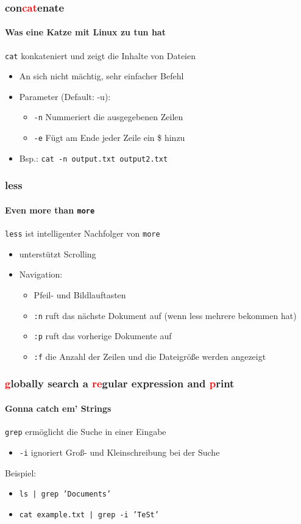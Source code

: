 \documentclass[12pt,utf8]{beamer}
\begin{document}
\begin{frame}
	\frametitle{con\textcolor{red}{cat}enate}
	\framesubtitle{\textcolor{ownDarkOr}{Was eine Katze mit Linux zu tun hat}}
	\texttt{cat} konkateniert und zeigt die Inhalte von Dateien
	\begin{itemize}
		\item An sich nicht mächtig, sehr einfacher Befehl
		\item Parameter (Default: -u):
		\begin{itemize}[<+->]
			\item \texttt{-n} Nummeriert die ausgegebenen Zeilen 
			\item \texttt{-e} Fügt am Ende jeder Zeile ein \$ hinzu
		\end{itemize}
		\item Bsp.: \texttt{cat -n output.txt output2.txt}
	\end{itemize}
\end{frame}

\begin{frame}
\frametitle{less}
\framesubtitle{\textcolor{ownDarkOr}{Even more than \texttt{more}}}
\texttt{less} ist intelligenter Nachfolger von \texttt{more}
\begin{itemize}
	\item unterstützt Scrolling
	\item Navigation:
	\begin{itemize}[<+->]
		\item Pfeil- und Bildlauftasten
		\item \texttt{:n} ruft das nächste Dokument auf (wenn less mehrere bekommen hat)
		\item \texttt{:p} ruft das vorherige Dokumente auf
		\item \texttt{:f} die Anzahl der Zeilen und die Dateigröße werden angezeigt
	\end{itemize}
\end{itemize}
\end{frame}

\begin{frame}
	\frametitle{\textcolor{red}{g}lobally search a \textcolor{red}{re}gular expression and \textcolor{red}{p}rint}
	\framesubtitle{\textcolor{ownDarkOr}{Gonna catch em' Strings}}
	\texttt{grep} ermöglicht die Suche in einer Eingabe
	\begin{itemize}
		\item \texttt{-i} ignoriert Groß- und Kleinschreibung bei der Suche
	\end{itemize}
	Beispiel:
	\begin{itemize}
		\item \texttt{ls | grep 'Documents'}
		\item \texttt{cat example.txt | grep -i 'TeSt'}
	\end{itemize}
\end{frame}
\end{document}
